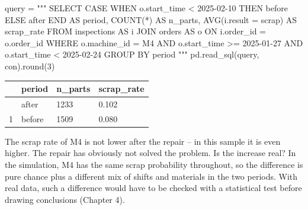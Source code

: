 \documentclass[
  letterpaper,
  DIV=11,
  numbers=noendperiod]{scrreprt}
\newenvironment{Shaded}{\begin{snugshade}}{\end{snugshade}}
\newcommand{\BuiltInTok}[1]{\textcolor[rgb]{0.00,0.23,0.31}{#1}}
\newcommand{\DecValTok}[1]{\textcolor[rgb]{0.68,0.00,0.00}{#1}}
\newcommand{\NormalTok}[1]{\textcolor[rgb]{0.00,0.23,0.31}{#1}}
\newcommand{\OperatorTok}[1]{\textcolor[rgb]{0.37,0.37,0.37}{#1}}
\newcommand{\StringTok}[1]{\textcolor[rgb]{0.13,0.47,0.30}{#1}}
\begin{document}
\begin{tcolorbox}[enhanced jigsaw, left=2mm, title=\textcolor{quarto-callout-caution-color}{\faFire}\hspace{0.5em}{Solution to Exercise 4}, opacityback=0, breakable, rightrule=.15mm, arc=.35mm, toptitle=1mm, colbacktitle=quarto-callout-caution-color!10!white, opacitybacktitle=0.6, coltitle=black, colframe=quarto-callout-caution-color-frame, bottomrule=.15mm, leftrule=.75mm, bottomtitle=1mm, titlerule=0mm, toprule=.15mm, colback=white]

\begin{Shaded}
\begin{Highlighting}[]
\NormalTok{query }\OperatorTok{=} \StringTok{"""}
\StringTok{SELECT CASE WHEN o.start\_time \textless{} \textquotesingle{}2025{-}02{-}10\textquotesingle{} THEN \textquotesingle{}before\textquotesingle{} ELSE \textquotesingle{}after\textquotesingle{} END AS period,}
\StringTok{       COUNT(*) AS n\_parts, AVG(i.result = \textquotesingle{}scrap\textquotesingle{}) AS scrap\_rate}
\StringTok{FROM inspections AS i}
\StringTok{JOIN orders AS o ON i.order\_id = o.order\_id}
\StringTok{WHERE o.machine\_id = \textquotesingle{}M4\textquotesingle{} AND o.start\_time \textgreater{}= \textquotesingle{}2025{-}01{-}27\textquotesingle{} AND o.start\_time \textless{} \textquotesingle{}2025{-}02{-}24\textquotesingle{}}
\StringTok{GROUP BY period}
\StringTok{"""}
\NormalTok{pd.read\_sql(query, con).}\BuiltInTok{round}\NormalTok{(}\DecValTok{3}\NormalTok{)}
\end{Highlighting}
\end{Shaded}

\begin{longtable}[]{@{}llll@{}}
\toprule\noalign{}
& period & n\_parts & scrap\_rate \\
\midrule\noalign{}
\endhead
\bottomrule\noalign{}
\endlastfoot
0 & after & 1233 & 0.102 \\
1 & before & 1509 & 0.080 \\
\end{longtable}

The scrap rate of M4 is not lower after the repair -- in this sample it
is even higher. The repair has obviously not solved the problem. Is the
increase real? In the simulation, M4 has the same scrap probability
throughout, so the difference is pure chance plus a different mix of
shifts and materials in the two periods. With real data, such a
difference would have to be checked with a statistical test before
drawing conclusions (Chapter 4).

\end{tcolorbox}
\end{document}
